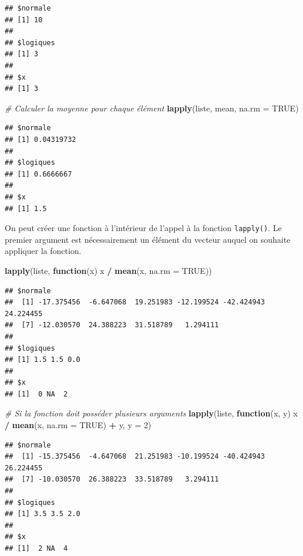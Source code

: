 \documentclass[
  11pt,
]{book}
\newenvironment{Shaded}{\begin{snugshade}}{\end{snugshade}}
\newcommand{\CommentTok}[1]{\textcolor[rgb]{0.56,0.35,0.01}{\textit{#1}}}
\newcommand{\ControlFlowTok}[1]{\textcolor[rgb]{0.13,0.29,0.53}{\textbf{#1}}}
\newcommand{\DataTypeTok}[1]{\textcolor[rgb]{0.13,0.29,0.53}{#1}}
\newcommand{\DecValTok}[1]{\textcolor[rgb]{0.00,0.00,0.81}{#1}}
\newcommand{\KeywordTok}[1]{\textcolor[rgb]{0.13,0.29,0.53}{\textbf{#1}}}
\newcommand{\NormalTok}[1]{#1}
\newcommand{\OperatorTok}[1]{\textcolor[rgb]{0.81,0.36,0.00}{\textbf{#1}}}
\newcommand{\OtherTok}[1]{\textcolor[rgb]{0.56,0.35,0.01}{#1}}
\newcommand{\StringTok}[1]{\textcolor[rgb]{0.31,0.60,0.02}{#1}}
\numberwithin{equation}{section}
\numberwithin{countremarque}{section}
\begin{document}
\begin{lstlisting}
## $normale
## [1] 10
## 
## $logiques
## [1] 3
## 
## $x
## [1] 3
\end{lstlisting}

\begin{Shaded}
\begin{Highlighting}[]
\CommentTok{\# Calculer la moyenne pour chaque élément}
\KeywordTok{lapply}\NormalTok{(liste, mean, }\DataTypeTok{na.rm =} \OtherTok{TRUE}\NormalTok{)}
\end{Highlighting}
\end{Shaded}

\begin{lstlisting}
## $normale
## [1] 0.04319732
## 
## $logiques
## [1] 0.6666667
## 
## $x
## [1] 1.5
\end{lstlisting}

On peut créer une fonction à l'intérieur de l'appel à la fonction \texttt{lapply()}. Le premier argument est nécessairement un élément du vecteur auquel on souhaite appliquer la fonction.

\begin{Shaded}
\begin{Highlighting}[]
\KeywordTok{lapply}\NormalTok{(liste, }\ControlFlowTok{function}\NormalTok{(x) x }\OperatorTok{/}\StringTok{ }\KeywordTok{mean}\NormalTok{(x, }\DataTypeTok{na.rm =} \OtherTok{TRUE}\NormalTok{))}
\end{Highlighting}
\end{Shaded}

\begin{lstlisting}
## $normale
##  [1] -17.375456  -6.647068  19.251983 -12.199524 -42.424943  24.224455
##  [7] -12.030570  24.388223  31.518789   1.294111
## 
## $logiques
## [1] 1.5 1.5 0.0
## 
## $x
## [1]  0 NA  2
\end{lstlisting}

\begin{Shaded}
\begin{Highlighting}[]
\CommentTok{\# Si la fonction doit posséder plusieurs arguments}
\KeywordTok{lapply}\NormalTok{(liste, }\ControlFlowTok{function}\NormalTok{(x, y) x }\OperatorTok{/}\StringTok{ }\KeywordTok{mean}\NormalTok{(x, }\DataTypeTok{na.rm =} \OtherTok{TRUE}\NormalTok{) }\OperatorTok{+}\StringTok{ }\NormalTok{y, }\DataTypeTok{y =} \DecValTok{2}\NormalTok{)}
\end{Highlighting}
\end{Shaded}

\begin{lstlisting}
## $normale
##  [1] -15.375456  -4.647068  21.251983 -10.199524 -40.424943  26.224455
##  [7] -10.030570  26.388223  33.518789   3.294111
## 
## $logiques
## [1] 3.5 3.5 2.0
## 
## $x
## [1]  2 NA  4
\end{lstlisting}
\end{document}
